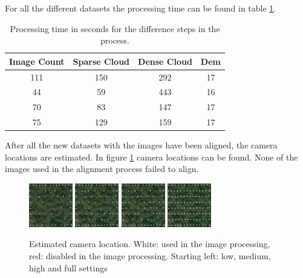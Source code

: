 \documentclass{isprs} %
\begin{document}
For all the different datasets the processing time can be found in table \ref{tab:processingTime}.  

\begin{table}[h]
    \centering
    \caption{Processing time in seconds for the difference steps in the process.}
    \label{tab:processingTime}
    \begin{tabular}{@{}cccc@{}}
    \toprule
    \textbf{Image Count} & \textbf{Sparse  Cloud} & \textbf{Dense Cloud} & \textbf{Dem} \\ \midrule
    111                  & 150                    & 292                  & 17           \\
    44                   & 59                     & 443                  & 16           \\
    70                   & 83                     & 147                  & 17           \\
    75                   & 129                    & 159                  & 17           \\ \bottomrule
    \end{tabular}
\end{table}

After all the new datasets with the images have been aligned, the camera locations are estimated.
In figure \ref{fig:cameralocation} camera locations can be found. 
None of the images used in the alignment process failed to align.


\begin{figure}[h]
    \centering
    \includegraphics[width=1.9cm]{loc_low.png}
    \includegraphics[width=1.9cm]{loc_med.png}
    \includegraphics[width=1.9cm]{loc_high.png}
    \includegraphics[width=1.9cm]{loc_full.png}
    \caption{Estimated camera location. 
    White: used in the image processing, red: disabled in the image processing.
    Starting left: low, medium, high and full settings}
    \label{fig:cameralocation}
\end{figure}
\end{document}
